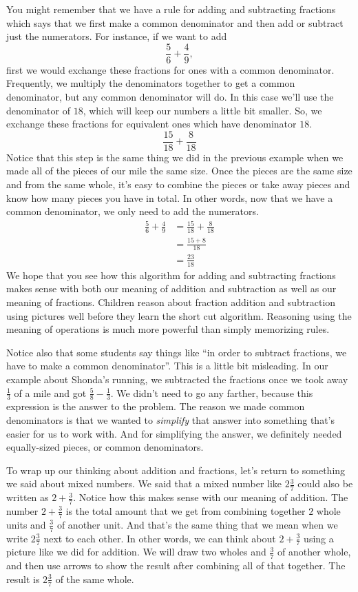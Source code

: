 \documentclass{ximera}
\begin{document}
You might remember that we have a rule for adding and subtracting fractions which says that we first make a common denominator and then add or subtract just the numerators. For instance, if we want to add
\[
\frac{5}{6} + \frac{4}{9}, 
\]
first we would exchange these fractions for ones with a common denominator. Frequently, we multiply the denominators together to get a common denominator, but any common denominator will do. In this case we'll use the denominator of $18$, which will keep our numbers a little bit smaller. So, we exchange these fractions for equivalent ones which have denominator $18$.
\[
\frac{15}{18} + \frac{8}{18}
\]
Notice that this step is the same thing we did in the previous example when we made all of the pieces of our mile the same size. Once the pieces are the same size and from the same whole, it's easy to combine the pieces or take away pieces and know how many pieces you have in total. In other words, now that we have a common denominator, we only need to add the numerators.
\begin{align*}
\frac{5}{6} + \frac{4}{9} &= \frac{15}{18} + \frac{8}{18} \\
&= \frac{15+8}{18} \\
&= \frac{23}{18}
\end{align*}
We hope that you see how this algorithm for adding and subtracting fractions makes sense with both our meaning of addition and subtraction as well as our meaning of fractions. Children reason about fraction addition and subtraction using pictures well before they learn the short cut algorithm. Reasoning using the meaning of operations is much more powerful than simply memorizing rules.

Notice also that some students say things like ``in order to subtract fractions, we have to make a common denominator''. This is a little bit misleading. In our example about Shonda's running, we subtracted the fractions once we took away $\frac{1}{3}$ of a mile and got $\frac{5}{8} - \frac{1}{3}$. We didn't need to go any farther, because this expression is the answer to the problem. The reason we made common denominators is that we wanted to \emph{simplify} that answer into something that's easier for us to work with. And for simplifying the answer, we definitely needed equally-sized pieces, or common denominators.


To wrap up our thinking about addition and fractions, let's return to something we said about mixed numbers. We said that a mixed number like $2 \frac{3}{7}$ could also be written as $2 + \frac{3}{7}$. Notice how this makes sense with our meaning of addition. The number $2 + \frac{3}{7}$ is the total amount that we get from combining together $2$ whole units and $\frac{3}{7}$ of another unit. And that's the same thing that we mean when we write $2 \frac{3}{7}$ next to each other. In other words, we can think about $2 + \frac{3}{7}$ using a picture like we did for addition. We will draw two wholes and $\frac{3}{7}$ of another whole, and then use arrows to show the result after combining all of that together. The result is $2 \frac{3}{7}$ of the same whole.
\end{document}
